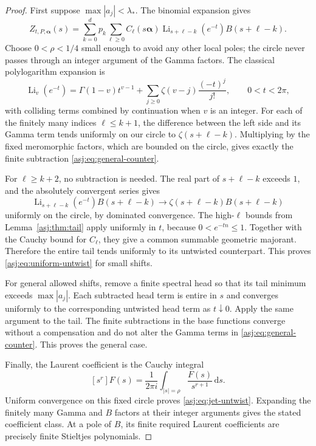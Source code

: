 \documentclass[11pt]{article}
\numberwithin{equation}{section}
\theoremstyle{definition}\newtheorem{definition}[theorem]{Definition}
\theoremstyle{remark}\newtheorem{remark}[theorem]{Remark}\newtheorem{example}[theorem]{Example}
\newcommand{\dd}{\,\mathrm d}\newcommand{\Rea}{\operatorname{Re}}
\DeclareMathOperator{\Li}{Li}\DeclareMathOperator{\FP}{FP}\DeclareMathOperator{\Res}{Res}
\begin{document}
\begin{proof}
First suppose $\max|a_j|<\lambda_*$. The binomial expansion gives
\[
 Z_{t,P,\boldsymbol\alpha}(s)
  =\sum_{k=0}^d p_k\sum_{\ell\ge0}C_\ell(s\boldsymbol\alpha)
          \Li_{s+\ell-k}(e^{-t}) B(s+\ell-k).
\]
Choose $0<\rho<1/4$ small enough to avoid any other local poles; the
circle never passes through an integer argument of the Gamma factors.
The classical polylogarithm expansion is \cite[Eq.~25.12.12]{dlmf-polylog}
\begin{equation}\label{asj:eq:Jonquiere}
 \Li_v(e^{-t})=\Gamma(1-v)t^{v-1}
                 +\sum_{j\ge0}\zeta(v-j)\frac{(-t)^j}{j!},
 \qquad 0<t<2\pi,
\end{equation}
with colliding terms combined by continuation when $v$ is an integer.
For each of the finitely many indices $\ell\le k+1$, the difference
between the left side and its Gamma term tends uniformly on our circle
to $\zeta(s+\ell-k)$. Multiplying by the fixed meromorphic factors,
which are bounded on the circle, gives exactly the finite subtraction
\eqref{asj:eq:general-counter}.

For $\ell\ge k+2$, no subtraction is needed. The real part of
$s+\ell-k$ exceeds $1$, and the absolutely convergent series gives
\[
 \Li_{s+\ell-k}(e^{-t})B(s+\ell-k)
    \longrightarrow \zeta(s+\ell-k)B(s+\ell-k)
\]
uniformly on the circle, by dominated convergence. The high-$\ell$
bounds from Lemma~\ref{asj:thm:tail} apply uniformly in $t$, because
$0<e^{-tn}\le1$. Together with the Cauchy bound for $C_\ell$, they give
a common summable geometric majorant. Therefore the entire tail tends
uniformly to its untwisted counterpart. This proves
\eqref{asj:eq:uniform-untwist} for small shifts.

For general allowed shifts, remove a finite spectral head so that its
tail minimum exceeds $\max|a_j|$. Each subtracted head term is entire
in $s$ and converges uniformly to the corresponding untwisted head term
as $t\downarrow0$. Apply the same argument to the tail. The finite
subtractions in the base functions converge without a compensation and
do not alter the Gamma terms in \eqref{asj:eq:general-counter}. This proves
the general case.

Finally, the Laurent coefficient is the Cauchy integral
\[
 [s^r]F(s)=\frac1{2\pi i}\int_{|s|=\rho}\frac{F(s)}{s^{r+1}}\dd s.
\]
Uniform convergence on this fixed circle proves
\eqref{asj:eq:jet-untwist}. Expanding the finitely many Gamma and $B$ factors
at their integer arguments gives the stated coefficient class. At a
pole of $B$, its finite required Laurent coefficients are precisely
finite Stieltjes polynomials.
\end{proof}
\end{document}
